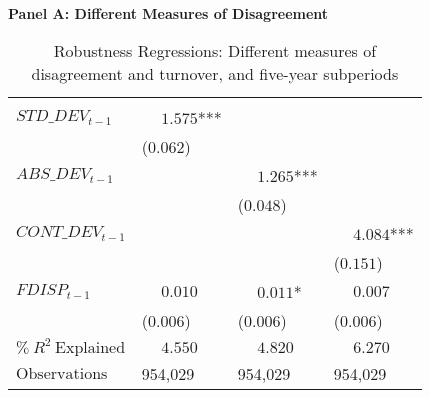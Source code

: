 
\begin{landscape}
\begin{table}



\caption[Robustness Results]{\label{tab:reg_robustness_diff_measures_and_periods}Robustness Regressions: Different measures of disagreement and turnover, and five-year subperiods}
\centering
\fontsize{8.5}{10.5}\selectfont
\begin{threeparttable}
\phantom{ }\\
\textbf{Panel A: Different Measures of Disagreement}
\begin{tabular}[t]{>{\raggedright\arraybackslash}p{7.5cm}>{\raggedright\arraybackslash}p{3.7cm}>{\raggedright\arraybackslash}p{3.7cm}>{\raggedright\arraybackslash}p{3.7cm}}
\toprule
\multicolumn{1}{c}{ } & \multicolumn{3}{c}{$L\_TURN_t$} \\
\cmidrule(l{3pt}r{3pt}){2-4}
$STD\_DEV_{t-1}$ & $\phantom{-}1.575$*** &  & \\
 & (\phantom{-}$0.062$) &  & \\
$ABS\_DEV_{t-1}$ &  & $\phantom{-}1.265$*** & \\
 &  & (\phantom{-}$0.048$) & \\
$CONT\_DEV_{t-1}$ &  &  & $\phantom{-}4.084$***\\
 &  &  & (\phantom{-}$0.151$)\\
\addlinespace
$FDISP_{t-1}$ & $\phantom{-}0.010$ & $\phantom{-}0.011$* & $\phantom{-}0.007$\\
 & (\phantom{-}$0.006$) & (\phantom{-}$0.006$) & (\phantom{-}$0.006$)\\
\midrule
$\% \: R^2 \: \textrm{Explained}$ & {$\phantom{-}4.550$} & {$\phantom{-}4.820$} & {$\phantom{-}6.270$}\\
$\textrm{Observations}$ & {\phantom{-}954,029} & {\phantom{-}954,029} & {\phantom{-}954,029}\\
\bottomrule
\end{tabular}
\begin{tablenotes}
\item 
\end{tablenotes}
\end{threeparttable}



\centering\fontsize{8.5}{10.5}\selectfont


\end{table}
\end{landscape}
